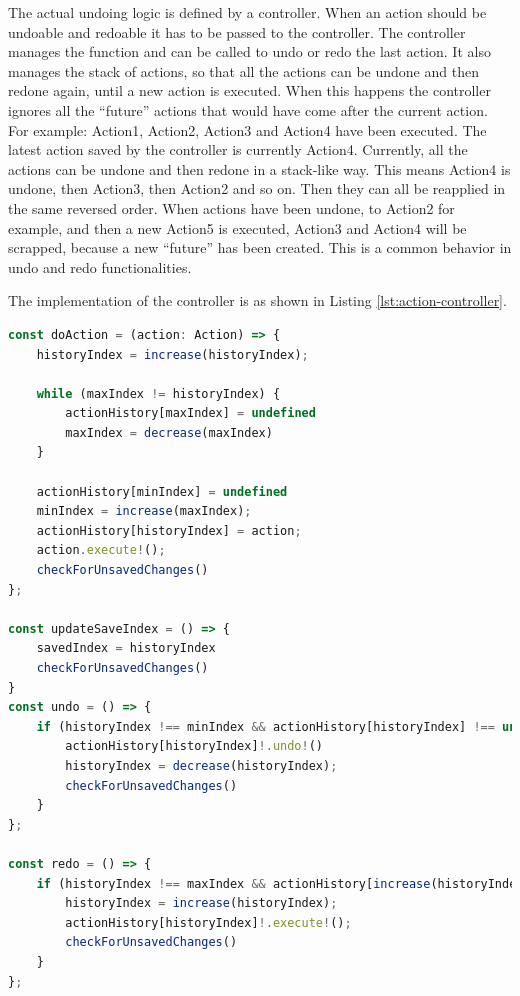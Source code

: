 The actual undoing logic is defined by a controller. When an action should be undoable and redoable it has to be passed to the controller. The controller manages the function and can be called to undo or redo the last action. It also manages the stack of actions, so that all the actions can be undone and then redone again, until a new action is executed. When this happens the controller ignores all the ``future'' actions that would have come after the current action. For example: Action1, Action2, Action3 and Action4 have been executed. The latest action saved by the controller is currently Action4. Currently, all the actions can be undone and then redone in a stack-like way. This means Action4 is undone, then Action3, then Action2 and so on. Then they can all be reapplied in the same reversed order. When actions have been undone, to Action2 for example, and then a new Action5 is executed, Action3 and Action4 will be scrapped, because a new ``future'' has been created. This is a common behavior in undo and redo functionalities.

The implementation of the controller is as shown in Listing \ref{lst:action-controller}.

\begin{lstlisting}[language=TypeScript,caption={Action Controller Implementation},label={lst:action-controller}]
const doAction = (action: Action) => {
    historyIndex = increase(historyIndex);

    while (maxIndex != historyIndex) {
        actionHistory[maxIndex] = undefined
        maxIndex = decrease(maxIndex)
    }

    actionHistory[minIndex] = undefined
    minIndex = increase(maxIndex);
    actionHistory[historyIndex] = action;
    action.execute!();
    checkForUnsavedChanges()
};

const updateSaveIndex = () => {
    savedIndex = historyIndex
    checkForUnsavedChanges()
}
const undo = () => {
    if (historyIndex !== minIndex && actionHistory[historyIndex] !== undefined) {
        actionHistory[historyIndex]!.undo!()
        historyIndex = decrease(historyIndex);
        checkForUnsavedChanges()
    }
};

const redo = () => {
    if (historyIndex !== maxIndex && actionHistory[increase(historyIndex)] !== undefined) {
        historyIndex = increase(historyIndex);
        actionHistory[historyIndex]!.execute!();
        checkForUnsavedChanges()
    }
};

\end{lstlisting}

